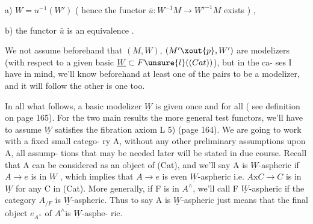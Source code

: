 
a) $W = u^{-1}(W')$ ( hence the functor $\bar{u} : W^{-1}M \to W'^{-1}M$ exists ) ,

b) the functor $\bar{u}$ is an equivalence .

We  not assume beforehand that $(M,W)$, $(M'\xout{p},W')$ are modelizers
(with respect to a given basic  $\underline{W} \subset F\unsure{l}((Cat))$), but in the ca-%
ses I have in mind, we'll know beforehand at least one of the pairs to
be a modelizer, and it will follow the other is one too.

In all what follows, a basic modelizer $\underline{W}$ is given once and for all
( see definition on page 165). For the two main results  the more
general test functors, we'll have to assume $\underline{W}$ satisfies the fibration
axiom L 5) (page 164). We are going to work with a fixed small catego-%
ry A,  without any other preliminary assumptions upon A, all assump-%
tions that may be needed later will be stated in due course. Recall that
A can be considered as an object of (Cat), and we'll say A is $\underline{W}$-aspheric
if $A \to e$ is in $\underline{W}$ , which implies that $A \to e$ is even $\underline{W}$-aspheric i.e.
$A\mathrm{x}C \to C$ is in $\underline{W}$ for any C in (Cat). More generally, if F is in $A^{\wedge}$,
we'll call F $\underline{W}$-aspheric if the category $A_{/F}$ is $\underline{W}$-aspheric. Thus to
say A is $\underline{W}$-aspheric just means that the final object $e_{A^{\wedge}}$ of $A^{\wedge}$is $\underline{W}$-asphe-%
ric.

